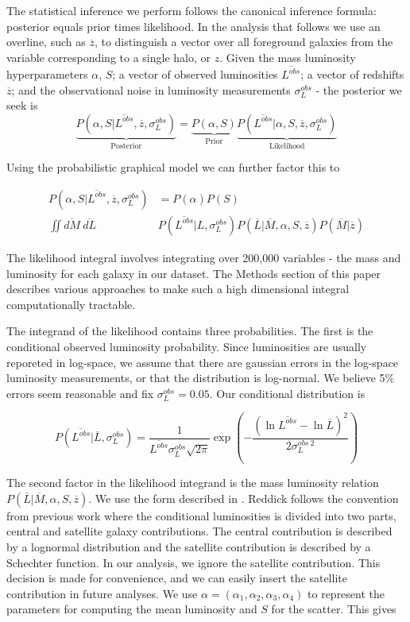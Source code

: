 \documentclass[\docopts]{\docclass}
\begin{document}
The statistical inference we perform follows the canonical inference formula: posterior equals prior times likelihood. 
In the analysis that follows we use an overline, such as $\overline{z}$, to distinguish a vector over all foreground galaxies from the variable corresponding to a single halo, or $z$.
Given the mass luminosity hyperparameters $\alpha$, $S$; a vector of observed luminosities $\overline{L^{obs}}$; a vector of redshifts $\overline{z}$; and the observational noise in luminosity measurements $\sigma_L^{obs}$ - the posterior we seek is
$$\underbrace{P(\alpha, S| \overline{L^{obs}}, \overline{z}, \sigma_L^{obs})}_{
	\text{Posterior}} = 
\underbrace{P(\alpha, S)}_{\text{Prior}} \underbrace{P(\overline{L^{obs}}| \alpha, S, \overline{z}, \sigma_L^{obs})}_{\text{Likelihood}}$$

Using the probabilistic graphical model we can further factor this to

\begin{align*}P(\alpha, S| \overline{L^{obs}}, \overline{z}, \sigma_L^{obs}) &= P(\alpha)P(S) \\
 \iint \overline{dM}\ \overline{dL}\ &P(\overline{L^{obs}}| L, \sigma_L^{obs}) P(\overline{L}|\overline{M},\alpha,S,\overline{z})P(\overline{M}|\overline{z})
\end{align*}

The likelihood integral involves integrating over 200,000 variables - the mass and luminosity for each galaxy in our dataset. 
The Methods section of this paper describes various approaches to make such a high dimensional integral computationally tractable. 

The integrand of the likelihood contains three probabilities. 
The first is the conditional observed luminosity probability. 
Since luminosities are usually reporeted in log-space, we assume that there are gaussian errors in the log-space luminosity measurements, or that the distribution is log-normal. 
We believe 5\% errors seem reasonable and fix $\sigma_L^{obs} = 0.05$. Our conditional distribution is 

$$P(\overline{L^{obs}}| \overline{L}, \sigma_L^{obs}) = \frac{1}{\overline{L^{obs}}\sigma_L^{obs}\sqrt{2\pi}}\exp\left(-\frac{(\ln \overline{L^{obs}} - \ln \overline{L})^2}{2\sigma_L^{obs\ 2}}\right)$$

The second factor in the likelihood integrand is the mass luminosity relation $P(\overline{L}|\overline{M},\alpha,S,\overline{z})$. 
We use the form described in \cite{reddick}. 
Reddick follows the convention from previous work where the conditional luminosities is divided into two parts, central and satellite galaxy contributions. 
The central contribution is described by a lognormal distribution and the satellite contribution is described by a Schechter function. 
In our analysis, we ignore the satellite contribution. 
This decision is made for convenience, and we can easily insert the satellite contribution in future analyses. 
We use $\alpha = (\alpha_1, \alpha_2, \alpha_3, \alpha_4)$ to represent the parameters for computing the mean luminosity and $S$ for the scatter. 
This gives
\end{document}
